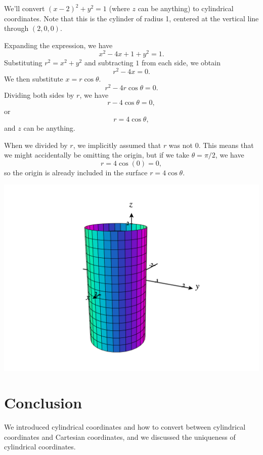\documentclass{ximera}
\begin{document}
\begin{example}
We'll convert $(x-2)^2 + y^2 = 1$ (where $z$ can be anything) to cylindrical coordinates. Note that this is the cylinder of radius 1, centered at the vertical line through $(2,0,0)$.

Expanding the expression, we have
\[
x^2-4x+1+y^2 =1.
\]
Substituting $r^2 = x^2+y^2$ and subtracting $1$ from each side, we obtain
\[
r^2-4x=0.
\]
We then substitute $x = r\cos\theta$.
\[
r^2-4r\cos\theta = 0.
\]
Dividing both sides by $r$, we have
\[
r-4\cos\theta = 0,
\]
or
\[
r = 4\cos\theta,
\]
and $z$ can be anything.

When we divided by $r$, we implicitly assumed that $r$ was not $0$. This means that we might accidentally be omitting the origin, but if we take $\theta = \pi/2$, we have
\[
r = 4\cos(0) = 0,
\]
so the origin is already included in the surface $r = 4\cos\theta$.

\begin{image}
\includegraphics[width=\textwidth]{CalcPlot3D-cylinder_100}
\end{image}

\end{example}

\section*{Conclusion}

We introduced cylindrical coordinates and how to convert between cylindrical coordinates and Cartesian coordinates, and we discussed the uniqueness of cylindrical coordinates.
\end{document}
